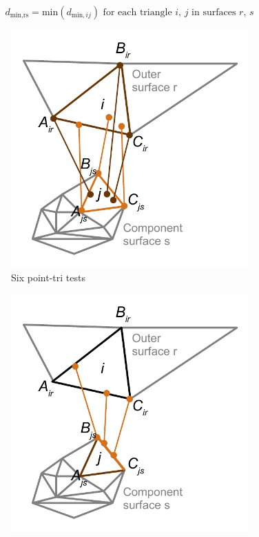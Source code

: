 \documentclass[11pt,letterpaper]{article}
\begin{document}
\begin{equation}
  \label{eq:dmin}
  d_\text{min,rs} = \text{min}(d_{\text{min},ij}) \text{ for each triangle } i, \, j \text{ in surfaces } r, \, s
\end{equation}

\begin{figure}[ht]
  \begin{subfigure}[b]{0.48\textwidth}
    \includegraphics[width=\textwidth]{figures/point-tri.pdf}
    \caption{Six point-tri tests}
    \label{fig:point-tri}
  \end{subfigure}
  \hfill
  \begin{subfigure}[b]{0.48\textwidth}
    \includegraphics[width=\textwidth]{figures/edge_edge.pdf}

\end{subfigure}
\end{figure}
\end{document}
